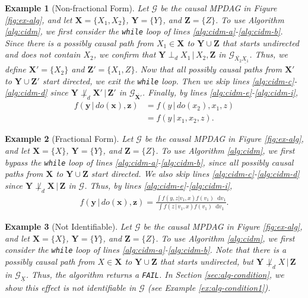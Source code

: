 \documentclass[11pt]{article}
\newtheorem{example}{Example}
\newcommand{\mb}[1]{\mathbf{#1}}
\newcommand{\dsepp}{\perp_{d}}
\newcommand{\g}[1][G]{\mathcal{#1}}
\newcommand*\diff{\mathop{}\!\mathrm{d}}
\begin{document}
\begin{example}[Non-fractional Form]
\label{ex:alg-pass1}
    Let $\g$ be the causal MPDAG in Figure \ref{fig:ex-alg}, and let $\mb{X} = \{X_1,X_2\}$, $\mb{Y} = \{Y\}$, and $\mb{Z} = \{Z\}$. To use Algorithm \ref{alg:cidm}, we first consider the \emph{\texttt{while}} loop of lines \ref{alg:cidm-a}-\ref{alg:cidm-b}. Since there is a possibly causal path from $X_1 \in \mb{X}$ to $\mb{Y} \cup \mb{Z}$ that starts undirected and does not contain $X_2$, we confirm that $\mb{Y} \dsepp X_1 \,|\, X_2, \mb{Z}$ in $\g_{\overline{X_2}\underline{X_1}}$. Thus, we define $\mb{X'} = \{X_2\}$ and $\mb{Z'} = \{X_1,Z\}$. Now that all possibly causal paths from $\mb{X'}$ to $\mb{Y} \cup \mb{Z'}$ start directed, we exit the \emph{\texttt{while}} loop. Then we skip lines \ref{alg:cidm-c}-\ref{alg:cidm-d} since $\mb{Y} \not\dsepp \mb{X'} \,|\, \mb{Z'}$ in $\g_{\overline{\mb{X'}}}$. Finally, by lines \ref{alg:cidm-e}-\ref{alg:cidm-i},
    \begin{align*}
        f(\mb{y} \,|\, do(\mb{x}), \mb{z}) 
            &= f(y \,|\, do(x_2), x_1, z)\\
            &= f(y \,|\, x_1,x_2,z).
    \end{align*}
\end{example}


\begin{example}[Fractional Form]
\label{ex:alg-pass2}
    Let $\g$ be the causal MPDAG in Figure \ref{fig:ex-alg}, and let $\mb{X} = \{X\}$, $\mb{Y} = \{Y\}$, and $\mb{Z} = \{Z\}$. To use Algorithm \ref{alg:cidm}, we first bypass the \emph{\texttt{while}} loop of lines \ref{alg:cidm-a}-\ref{alg:cidm-b}, since all possibly causal paths from $\mb{X}$ to $\mb{Y} \cup \mb{Z}$ start directed. We also skip lines \ref{alg:cidm-c}-\ref{alg:cidm-d} since $\mb{Y} \not\dsepp \mb{X} \,|\, \mb{Z}$ in $\g$. Thus, by lines \ref{alg:cidm-e}-\ref{alg:cidm-i},
    \begin{align*}
        f(\mb{y} \,|\, do(\mb{x}), \mb{z}) 
            = \frac{ \int f(y,z|v_1,x) f(v_1) \diff v_1 }
              {\int f(z \,|\, v_1 ,x) f(v_1) \diff v_1}.
    \end{align*}
\end{example}


\begin{example}[Not Identifiable]
\label{ex:alg-fail1}
    Let $\g$ be the causal MPDAG in Figure \ref{fig:ex-alg}, and let $\mb{X} = \{X\}$, $\mb{Y} = \{Y\}$, and $\mb{Z} = \{Z\}$. To use Algorithm \ref{alg:cidm}, we first consider the \emph{\texttt{while}} loop of lines \ref{alg:cidm-a}-\ref{alg:cidm-b}. Note that there is a possibly causal path from $X \in \mb{X}$ to $\mb{Y} \cup \mb{Z}$ that starts undirected, but $\mb{Y} \not\dsepp X \,|\, \mb{Z}$ in $\g_{\underline{X}}$. Thus, the algorithm returns a \emph{\texttt{FAIL}}. In Section \ref{sec:alg-condition}, we show this effect is not identifiable in $\g$ (see Example \ref{ex:alg-condition1}).
\end{example}
\end{document}

